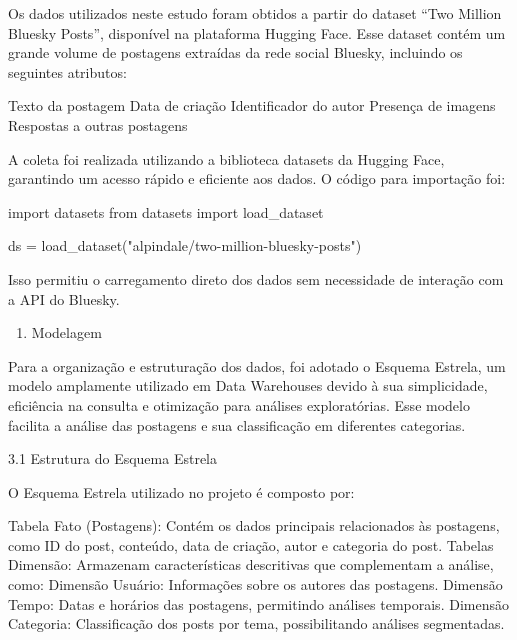 \documentclass[
  letterpaper,
  DIV=11,
  numbers=noendperiod]{scrartcl}
\newenvironment{Shaded}{\begin{snugshade}}{\end{snugshade}}
\newcommand{\ImportTok}[1]{\textcolor[rgb]{0.00,0.46,0.62}{#1}}
\newcommand{\NormalTok}[1]{\textcolor[rgb]{0.00,0.23,0.31}{#1}}
\newcommand{\OperatorTok}[1]{\textcolor[rgb]{0.37,0.37,0.37}{#1}}
\newcommand{\StringTok}[1]{\textcolor[rgb]{0.13,0.47,0.30}{#1}}
\providecommand{\tightlist}{%
  \setlength{\itemsep}{0pt}\setlength{\parskip}{0pt}}\usepackage{longtable,booktabs,array}
\begin{document}
Os dados utilizados neste estudo foram obtidos a partir do dataset ``Two
Million Bluesky Posts'', disponível na plataforma Hugging Face. Esse
dataset contém um grande volume de postagens extraídas da rede social
Bluesky, incluindo os seguintes atributos:

\begin{VerbatimWithBreaks}
Texto da postagem
Data de criação
Identificador do autor
Presença de imagens
Respostas a outras postagens
\end{VerbatimWithBreaks}

A coleta foi realizada utilizando a biblioteca datasets da Hugging Face,
garantindo um acesso rápido e eficiente aos dados. O código para
importação foi:

\begin{Shaded}
\begin{Highlighting}[]
\ImportTok{import}\NormalTok{ datasets}
\ImportTok{from}\NormalTok{ datasets }\ImportTok{import}\NormalTok{ load\_dataset}

\NormalTok{ds }\OperatorTok{=}\NormalTok{ load\_dataset(}\StringTok{"alpindale/two{-}million{-}bluesky{-}posts"}\NormalTok{)}
\end{Highlighting}
\end{Shaded}

Isso permitiu o carregamento direto dos dados sem necessidade de
interação com a API do Bluesky.

\begin{enumerate}
\def\labelenumi{\arabic{enumi}.}
\setcounter{enumi}{2}
\tightlist
\item
  Modelagem 
\end{enumerate}

Para a organização e estruturação dos dados, foi adotado o Esquema
Estrela, um modelo amplamente utilizado em Data Warehouses devido à sua
simplicidade, eficiência na consulta e otimização para análises
exploratórias. Esse modelo facilita a análise das postagens e sua
classificação em diferentes categorias.

3.1 Estrutura do Esquema Estrela

O Esquema Estrela utilizado no projeto é composto por:

\begin{VerbatimWithBreaks}
Tabela Fato (Postagens): Contém os dados principais relacionados às postagens, como ID do post, conteúdo, data de criação, autor e categoria do post.
Tabelas Dimensão: Armazenam características descritivas que complementam a análise, como:
    Dimensão Usuário: Informações sobre os autores das postagens.
    Dimensão Tempo: Datas e horários das postagens, permitindo análises temporais.
    Dimensão Categoria: Classificação dos posts por tema, possibilitando análises segmentadas.
\end{VerbatimWithBreaks}
\end{document}
